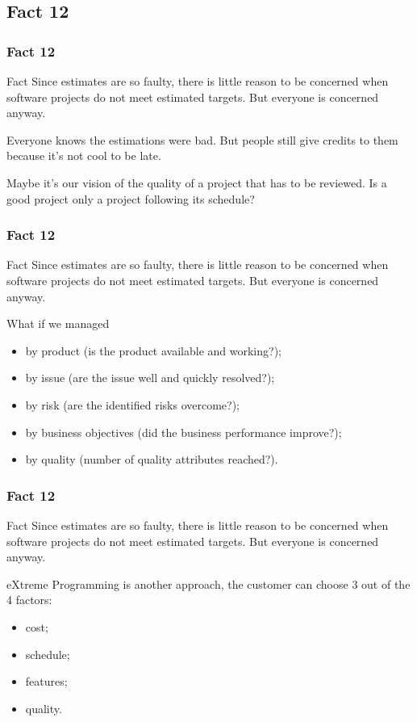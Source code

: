 \documentclass{beamer}
\begin{document}
\subsection{Fact 12}
\begin{frame}
    \frametitle{Fact 12}
    \begin{block}{Fact}
    Since estimates are so faulty, there is little reason to be concerned when
    software projects do not meet estimated targets. But everyone is concerned
    anyway.
    \end{block}
    \pause

    Everyone knows the estimations were bad. But people still give credits to
    them because it's not cool to be late. \newline
    \pause

    Maybe it's our vision of the quality of a project that has to be reviewed.
    Is a good project only a project following its schedule?
\end{frame}

\begin{frame}
    \frametitle{Fact 12}
    \begin{block}{Fact}
    Since estimates are so faulty, there is little reason to be concerned when
    software projects do not meet estimated targets. But everyone is concerned
    anyway.
    \end{block}
    \pause

    What if we managed
    \begin{itemize}
        \item by product (is the product available and working?);
        \pause
        \item by issue (are the issue well and quickly resolved?);
        \pause
        \item by risk (are the identified risks overcome?);
        \pause
        \item by business objectives (did the business performance improve?);
        \pause
        \item by quality (number of quality attributes reached?).
    \end{itemize}
\end{frame}

\begin{frame}
    \frametitle{Fact 12}
    \begin{block}{Fact}
    Since estimates are so faulty, there is little reason to be concerned when
    software projects do not meet estimated targets. But everyone is concerned
    anyway.
    \end{block}

    eXtreme Programming is another approach, the customer can choose 3 out of the
    4 factors:
    \begin{itemize}
        \item cost;
        \pause
        \item schedule;
        \pause
        \item features;
        \pause
        \item quality.
    \end{itemize}
\end{frame}
\end{document}
